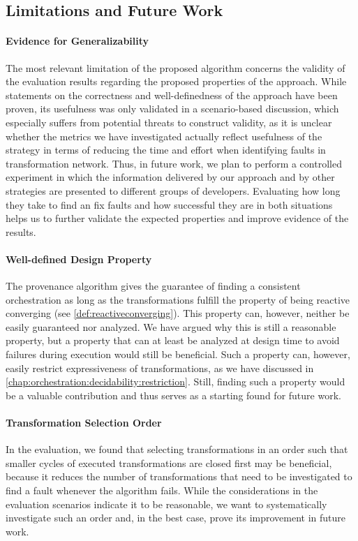 \subsection{Limitations and Future Work}
\label{chap:correctness_evaluation:orchestration:limitations}

\paragraph{Evidence for Generalizability}
The most relevant limitation of the proposed algorithm concerns the validity of the evaluation results regarding the proposed properties of the approach.
While statements on the correctness and well-definedness of the approach have been proven, its usefulness was only validated in a scenario-based discussion, which especially suffers from potential threats to construct validity, as it is unclear whether the metrics we have investigated actually reflect usefulness of the strategy in terms of reducing the time and effort when identifying faults in transformation network.
Thus, in future work, we plan to perform a controlled experiment in which the information delivered by our approach and by other strategies are presented to different groups of developers.
Evaluating how long they take to find an fix faults and how successful they are in both situations helps us to further validate the expected properties and improve evidence of the results.

\paragraph{Well-defined Design Property}
The provenance algorithm gives the guarantee of finding a consistent orchestration as long as the transformations fulfill the property of being reactive converging (see \autoref{def:reactiveconverging}).
This property can, however, neither be easily guaranteed nor analyzed.
We have argued why this is still a reasonable property, but a property that can at least be analyzed at design time to avoid failures during execution would still be beneficial.
Such a property can, however, easily restrict expressiveness of transformations, as we have discussed in \autoref{chap:orchestration:decidability:restriction}.
Still, finding such a property would be a valuable contribution and thus serves as a starting found for future work.

\paragraph{Transformation Selection Order}
In the evaluation, we found that selecting transformations in an order such that smaller cycles of executed transformations are closed first may be beneficial, because it reduces the number of transformations that need to be investigated to find a fault whenever the algorithm fails.
While the considerations in the evaluation scenarios indicate it to be reasonable, we want to systematically investigate such an order and, in the best case, prove its improvement in future work.


